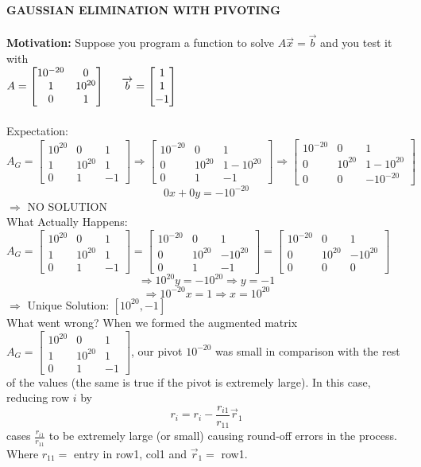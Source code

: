\documentclass [12pt]{article}
\begin{document}
\noindent\textbf{GAUSSIAN ELIMINATION WITH PIVOTING}\\\\
\noindent\textbf{Motivation:} Suppose you program a function to solve $A\overrightarrow{x}=\overrightarrow{b}$ and you test it with \\
$A=\begin{bmatrix}
10^{-20}&0\\
1&10^{20}\\
0&1
\end{bmatrix}\indent\overrightarrow{b}=\begin{bmatrix}
1\\
1\\
-1
\end{bmatrix}$\\\\
Expectation:\\
$A_G=\begin{bmatrix}
10^{20}&0&1\\
1&10^{20}&1\\
0&1&-1
\end{bmatrix}\Rightarrow\begin{bmatrix}
10^{-20}&0&1\\
0&10^{20}&1-10^{20}\\
0&1&-1
\end{bmatrix}\Rightarrow\begin{bmatrix}
10^{-20}&0&1\\
0&10^{20}&1-10^{20}\\
0&0&-10^{-20}
\end{bmatrix}$
\[0x+0y=-10^{-20}\]
$\Rightarrow $ NO SOLUTION \\
What Actually Happens:\\
$A_G=\begin{bmatrix}
10^{20}&0&1\\
1&10^{20}&1\\
0&1&-1
\end{bmatrix}=\begin{bmatrix}
10^{-20}&0&1\\
0&10^{20}&-10^{20}\\
0&1&-1
\end{bmatrix}=\begin{bmatrix}
10^{-20}&0&1\\
0&10^{20}&-10^{20}\\
0&0&0
\end{bmatrix}$
\[\Rightarrow10^{20}y=-10^{20}\Rightarrow y=-1\]
\[\Rightarrow 10^{-20}x=1\Rightarrow x=10^{20}\]
$\Rightarrow$ Unique Solution: $[10^{20}, -1]$\\
What went wrong? When we formed the augmented matrix $A_G=\begin{bmatrix}
10^{20}&0&1\\
1&10^{20}&1\\
0&1&-1
\end{bmatrix}$, our pivot $10^{-20}$ was small in comparison with the rest of the values (the same is true if the pivot is extremely large). In this case, reducing row $i$ by 
\[r_i=r_i-\frac{r_{i1}}{r_{11}}\overrightarrow{r}_1\] cases $\frac{r_{i1}}{r_11}$ to be extremely large (or small) causing round-off errors in the process. Where $r_{11}=$ entry in row1, col1 and $\overrightarrow{r}_1=$ row1.\\
\end{document}

